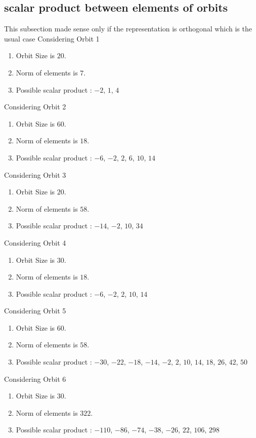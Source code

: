 \documentclass[12pt]{article}
\begin{document}
\subsection{scalar product between elements of orbits}
\noindent This subsection made sense only if the representation is orthogonal which is the usual case
Considering Orbit 1
\begin{enumerate}
\item Orbit Size is $20$.
\item Norm of elements is $7$.
\item Possible scalar product : $-2$, $1$, $4$
\end{enumerate}
Considering Orbit 2
\begin{enumerate}
\item Orbit Size is $60$.
\item Norm of elements is $18$.
\item Possible scalar product : $-6$, $-2$, $2$, $6$, $10$, $14$
\end{enumerate}
Considering Orbit 3
\begin{enumerate}
\item Orbit Size is $20$.
\item Norm of elements is $58$.
\item Possible scalar product : $-14$, $-2$, $10$, $34$
\end{enumerate}
Considering Orbit 4
\begin{enumerate}
\item Orbit Size is $30$.
\item Norm of elements is $18$.
\item Possible scalar product : $-6$, $-2$, $2$, $10$, $14$
\end{enumerate}
Considering Orbit 5
\begin{enumerate}
\item Orbit Size is $60$.
\item Norm of elements is $58$.
\item Possible scalar product : $-30$, $-22$, $-18$, $-14$, $-2$, $2$, $10$, $14$, $18$, $26$, $42$, $50$
\end{enumerate}
Considering Orbit 6
\begin{enumerate}
\item Orbit Size is $30$.
\item Norm of elements is $322$.
\item Possible scalar product : $-110$, $-86$, $-74$, $-38$, $-26$, $22$, $106$, $298$
\end{enumerate}
\end{document}
